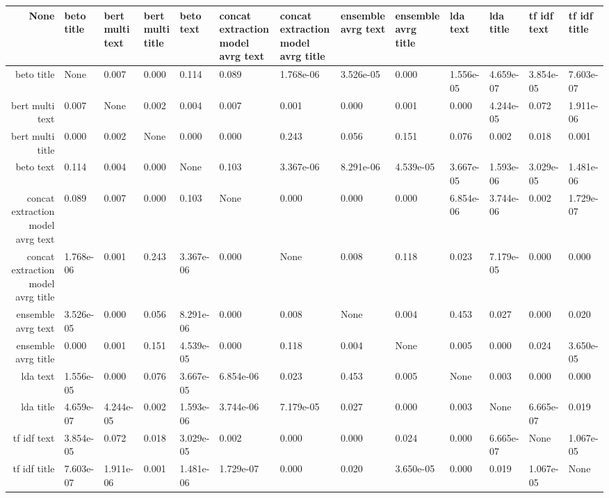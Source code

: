 \begin{tabular}{|r|l|l|l|l|l|l|l|l|l|l|l|l|}
  \hline
  None & beto title & bert multi text & bert multi title & beto text & concat extraction model avrg text & concat extraction model avrg title & ensemble avrg text & ensemble avrg title & lda text & lda title & tf idf text & tf idf title \\ 
  \hline
  beto title & None & 0.007 & 0.000 & 0.114 & 0.089 & 1.768e-06 & 3.526e-05 & 0.000 & 1.556e-05 & 4.659e-07 & 3.854e-05 & 7.603e-07 \\ 
  \hline
  bert multi text & 0.007 & None & 0.002 & 0.004 & 0.007 & 0.001 & 0.000 & 0.001 & 0.000 & 4.244e-05 & 0.072 & 1.911e-06 \\ 
  \hline
  bert multi title & 0.000 & 0.002 & None & 0.000 & 0.000 & 0.243 & 0.056 & 0.151 & 0.076 & 0.002 & 0.018 & 0.001 \\ 
  \hline
  beto text & 0.114 & 0.004 & 0.000 & None & 0.103 & 3.367e-06 & 8.291e-06 & 4.539e-05 & 3.667e-05 & 1.593e-06 & 3.029e-05 & 1.481e-06 \\ 
  \hline
  concat extraction model avrg text & 0.089 & 0.007 & 0.000 & 0.103 & None & 0.000 & 0.000 & 0.000 & 6.854e-06 & 3.744e-06 & 0.002 & 1.729e-07 \\ 
  \hline
  concat extraction model avrg title & 1.768e-06 & 0.001 & 0.243 & 3.367e-06 & 0.000 & None & 0.008 & 0.118 & 0.023 & 7.179e-05 & 0.000 & 0.000 \\ 
  \hline
  ensemble avrg text & 3.526e-05 & 0.000 & 0.056 & 8.291e-06 & 0.000 & 0.008 & None & 0.004 & 0.453 & 0.027 & 0.000 & 0.020 \\ 
  \hline
  ensemble avrg title & 0.000 & 0.001 & 0.151 & 4.539e-05 & 0.000 & 0.118 & 0.004 & None & 0.005 & 0.000 & 0.024 & 3.650e-05 \\ 
  \hline
  lda text & 1.556e-05 & 0.000 & 0.076 & 3.667e-05 & 6.854e-06 & 0.023 & 0.453 & 0.005 & None & 0.003 & 0.000 & 0.000 \\ 
  \hline
  lda title & 4.659e-07 & 4.244e-05 & 0.002 & 1.593e-06 & 3.744e-06 & 7.179e-05 & 0.027 & 0.000 & 0.003 & None & 6.665e-07 & 0.019 \\ 
  \hline
  tf idf text & 3.854e-05 & 0.072 & 0.018 & 3.029e-05 & 0.002 & 0.000 & 0.000 & 0.024 & 0.000 & 6.665e-07 & None & 1.067e-05 \\ 
  \hline
  tf idf title & 7.603e-07 & 1.911e-06 & 0.001 & 1.481e-06 & 1.729e-07 & 0.000 & 0.020 & 3.650e-05 & 0.000 & 0.019 & 1.067e-05 & None \\ 
  \hline
\end{tabular}
